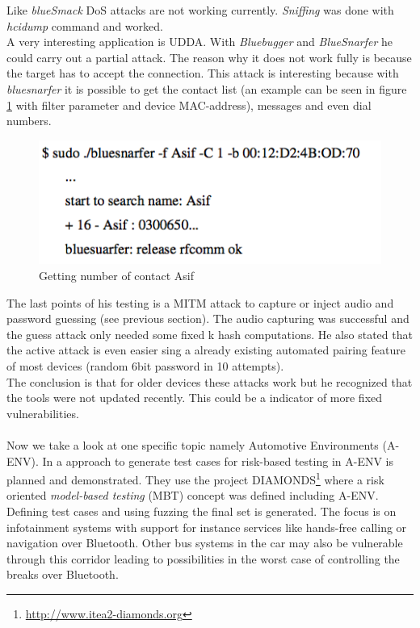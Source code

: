 \documentclass[12pt,a4paper]{article}
\begin{document}
Like \emph{blueSmack} DoS attacks are not working currently. \emph{Sniffing} was done with \emph{hcidump} command and worked.\\
A very interesting application is UDDA. With \emph{Bluebugger} and \emph{BlueSnarfer} he could carry out a partial attack. The reason why it does not work fully is because the target has to accept the connection. This attack is interesting because with \emph{bluesnarfer} it is possible to get the contact list (an example can be seen in figure \ref{img_bt_attack_bluesnarfer} with filter parameter and device MAC-address), messages and even dial numbers.
\begin{figure}[h]
\begin{center}
\includegraphics[scale=0.6]{img/bluesnarfer.png}
\caption{Getting number of contact Asif  \cite{DBLP:journals/corr/abs-1206-1482}}
\label{img_bt_attack_bluesnarfer}
\end{center}
\end{figure}
The last points of his testing is a MITM attack to capture or inject audio and password guessing (see previous section). The audio capturing was successful and the guess attack only needed some fixed k hash computations. He also stated that the active attack is even easier sing a already existing automated pairing feature of most devices (random 6bit password in 10 attempts).\\
The conclusion is that for older devices these attacks work but he recognized that the tools were not updated recently. This could be a indicator of more fixed vulnerabilities.\\
\\
Now we take a look at one specific topic namely Automotive Environments (A-ENV). In \cite{DBLP:conf/automotiveSS/JakobKSGMSF12} a approach to generate test cases for risk-based testing in A-ENV is planned and demonstrated. They use the project DIAMONDS\footnote{\url{http://www.itea2-diamonds.org}} where a risk oriented \emph{model-based testing} (MBT) concept was defined including A-ENV. Defining test cases and using fuzzing the final set is generated. The focus is on infotainment systems with support for instance services like hands-free calling or navigation over Bluetooth. Other bus systems in the car may also be vulnerable through this corridor leading to possibilities in the worst case of controlling the breaks over Bluetooth. \\
\end{document}
